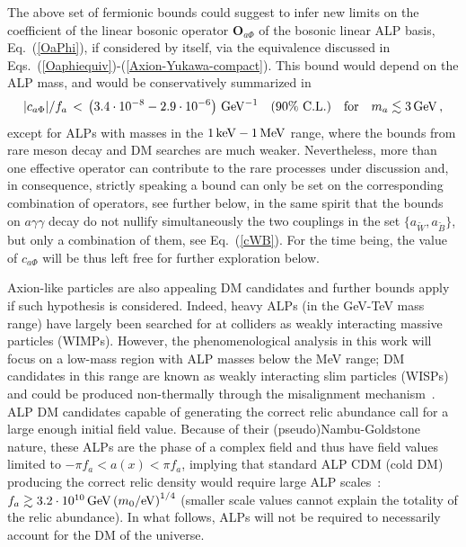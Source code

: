 \documentclass[11pt]{article}
\renewcommand{\O}{\mathbf{O}}
\newcommand{\cl}{\%\,\,  \text{C.L.}}
\newcommand{\beq}{\begin{equation}}
\newcommand{\eeq}{\end{equation}}
\renewcommand{\[}{\begin{equation}}
\renewcommand{\]}{\end{equation}}
\begin{document}
The above set of fermionic bounds could suggest to infer new limits on the coefficient of the linear bosonic operator  $\O_{a\Phi}$  of the bosonic linear ALP basis, Eq.~(\ref{OaPhi}), if considered by itself, via the equivalence discussed in Eqs.~(\ref{Oaphiequiv})-(\ref{Axion-Yukawa-compact}). This bound would depend on the ALP mass, and would be conservatively summarized in 
\beq \label{boundaphifermions}
|c_{a\Phi}|/f_a\,<\,\unit[\left(3.4\cdot 10^{-8} - 2.9\cdot10^{-6}\right)]{GeV^{-1}} \quad(90\cl)   \quad \text{for}\quad m_a \lesssim \unit[3]{GeV}\,,
\eeq  
except for ALPs with masses in the $\unit[1]{keV}-\unit[1]{MeV}$ range, where the bounds from rare meson decay and DM searches are much weaker. Nevertheless, more than one effective operator can contribute to the rare processes under discussion and, in consequence, strictly speaking a bound can only be set on the corresponding combination of operators, see further below, in the same spirit that the bounds on $a\gamma\gamma$ decay do not nullify simultaneously the two couplings in the set $\{a_{\tilde W}, a_{\tilde B}\}$, but only a combination of them, see Eq.~(\ref{cWB}). For the time being, the value of $c_{a\Phi}$ will be thus left free for further exploration below.



\vspace{0.3cm}


Axion-like particles are also appealing DM candidates and further bounds apply if such hypothesis is considered. 
 Indeed,  heavy ALPs (in the GeV-TeV mass range) have largely been searched for at colliders as weakly interacting massive particles (WIMPs).   However, the phenomenological analysis in this work will focus on a low-mass region with ALP masses below the MeV range;  
  DM candidates in this range are known as weakly interacting slim particles (WISPs) and could be produced non-thermally through the misalignment mechanism~\cite{Preskill:1982cy, Abbott:1982af, Dine:1982ah, Nelson:2011sf, Masso:2004cv}. ALP DM candidates capable of generating the correct relic abundance call for a large enough initial field value. Because of their (pseudo)Nambu-Goldstone  nature,  these ALPs are the phase of a complex field and thus have field values limited to $-\pi f_a< a(x) < \pi f_a$, implying  that standard ALP CDM (cold DM) producing the correct relic density would require large ALP scales~\cite{Arias:2012az}: $f_a \gtrsim \unit[3.2\cdot 10^{10}]{GeV} \left(m_0 / \unit[]{eV}\right)^{1/4}$ (smaller scale values cannot explain the totality of the relic abundance).  In what follows, ALPs will not be required to necessarily account for the DM of the universe. 
\end{document}
